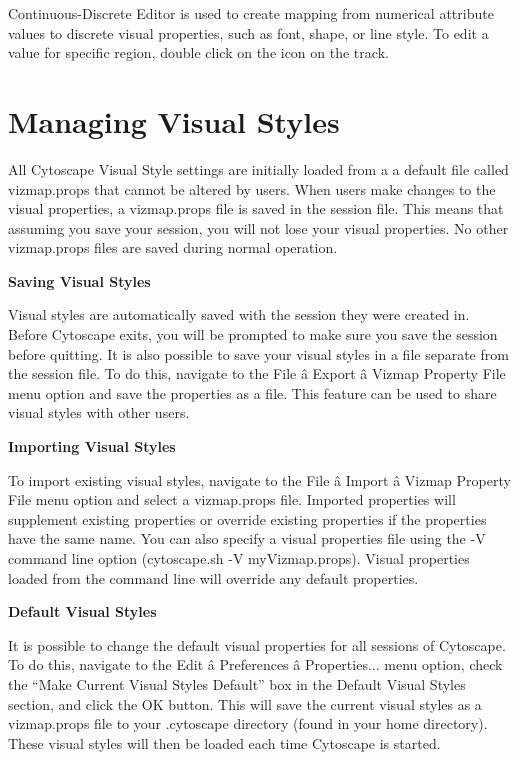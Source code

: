  Continuous-Discrete Editor is used to create mapping from numerical attribute values to discrete visual properties, such as font, shape, or line style. To edit a value for specific region, double click on the icon on the track. 


 

\section*{Managing Visual Styles}


 All Cytoscape Visual Style settings are initially loaded from a a default file called vizmap.props that cannot be altered by users. When users make changes to the visual properties, a vizmap.props file is saved in the session file. This means that assuming you save your session, you will not lose your visual properties. No other vizmap.props files are saved during normal operation. 


 \textbf{Saving Visual Styles}


 Visual styles are automatically saved with the session they were created in. Before Cytoscape exits, you will be prompted to make sure you save the session before quitting. It is also possible to save your visual styles in a file separate from the session file. To do this, navigate to the File \^a Export \^a Vizmap Property File menu option and save the properties as a file. This feature can be used to share visual styles with other users. 


 
\textbf{Importing Visual Styles}


 To import existing visual styles, navigate to the File \^a Import \^a Vizmap Property File menu option and select a vizmap.props file. Imported properties will supplement existing properties or override existing properties if the properties have the same name. You can also specify a visual properties file using the -V command line option (cytoscape.sh -V myVizmap.props). Visual properties loaded from the command line will override any default properties. 


 
\textbf{Default Visual Styles}


 It is possible to change the default visual properties for all sessions of Cytoscape. To do this, navigate to the Edit \^a Preferences \^a Properties... menu option, check the ``Make Current Visual Styles Default'' box in the Default Visual Styles section, and click the OK button. This will save the current visual styles as a vizmap.props file to your .cytoscape directory (found in your home directory). These visual styles will then be loaded each time Cytoscape is started. 


